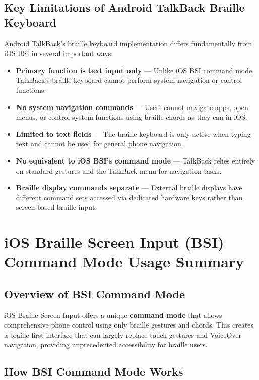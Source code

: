 \subsection{Key Limitations of Android TalkBack Braille Keyboard}

Android TalkBack's braille keyboard implementation differs fundamentally from iOS BSI in several important ways:

\begin{itemize}
	\item \textbf{Primary function is text input only} — Unlike iOS BSI command mode, TalkBack's braille keyboard cannot perform system navigation or control functions.
	\item \textbf{No system navigation commands} — Users cannot navigate apps, open menus, or control system functions using braille chords as they can in iOS.
	\item \textbf{Limited to text fields} — The braille keyboard is only active when typing text and cannot be used for general phone navigation.
	\item \textbf{No equivalent to iOS BSI's command mode} — TalkBack relies entirely on standard gestures and the TalkBack menu for navigation tasks.
	\item \textbf{Braille display commands separate} — External braille displays have different command sets accessed via dedicated hardware keys rather than screen-based braille input.
\end{itemize}

\section{iOS Braille Screen Input (BSI) Command Mode Usage Summary}

\subsection{Overview of BSI Command Mode}
iOS Braille Screen Input offers a unique \textbf{command mode} that allows comprehensive phone control using only braille gestures and chords. This creates a braille-first interface that can largely replace touch gestures and VoiceOver navigation, providing unprecedented accessibility for braille users.

\subsection{How BSI Command Mode Works}

